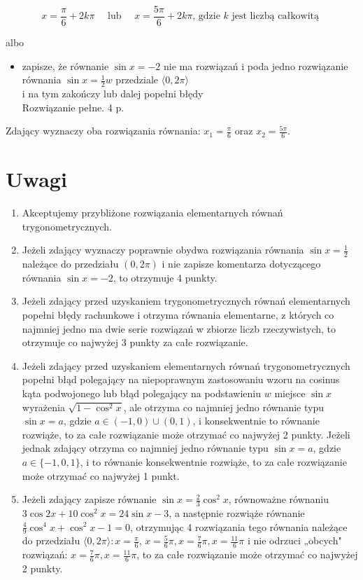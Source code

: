 \documentclass[10pt]{article}
\begin{document}
$$
x=\frac{\pi}{6}+2 k \pi \quad \text { lub } \quad x=\frac{5 \pi}{6}+2 k \pi \text {, gdzie } k \text { jest liczbą całkowitą }
$$

albo

\begin{itemize}
  \item zapisze, że równanie $\sin x=-2$ nie ma rozwiązań i poda jedno rozwiązanie równania $\sin x=\frac{1}{2} w$ przedziale $\langle 0,2 \pi\rangle$\\
i na tym zakończy lub dalej popełni błędy\\
Rozwiązanie pełne. 4 p.
\end{itemize}

Zdający wyznaczy oba rozwiązania równania: $x_{1}=\frac{\pi}{6}$ oraz $x_{2}=\frac{5 \pi}{6}$.

\section*{Uwagi}
\begin{enumerate}
  \item Akceptujemy przybliżone rozwiązania elementarnych równań trygonometrycznych.
  \item Jeżeli zdający wyznaczy poprawnie obydwa rozwiązania równania $\sin x=\frac{1}{2}$ należące do przedziału $(0,2 \pi)$ i nie zapisze komentarza dotyczącego równania $\sin x=-2$, to otrzymuje 4 punkty.
  \item Jeżeli zdający przed uzyskaniem trygonometrycznych równań elementarnych popełni błędy rachunkowe i otrzyma równania elementarne, z których co najmniej jedno ma dwie serie rozwiązań w zbiorze liczb rzeczywistych, to otrzymuje co najwyżej 3 punkty za całe rozwiązanie.
  \item Jeżeli zdający przed uzyskaniem elementarnych równań trygonometrycznych popełni błąd polegający na niepoprawnym zastosowaniu wzoru na cosinus kąta podwojonego lub błąd polegający na podstawieniu $w$ miejsce $\sin x$ wyrażenia $\sqrt{1-\cos ^{2} x}$, ale otrzyma co najmniej jedno równanie typu $\sin x=a$, gdzie $a \in(-1,0) \cup(0,1)$, i konsekwentnie to równanie rozwiąże, to za całe rozwiązanie może otrzymać co najwyżej 2 punkty. Jeżeli jednak zdający otrzyma co najmniej jedno równanie typu $\sin x=a$, gdzie $a \in\{-1,0,1\}$, i to równanie konsekwentnie rozwiąże, to za całe rozwiązanie może otrzymać co najwyżej 1 punkt.
  \item Jeżeli zdający zapisze równanie $\sin x=\frac{2}{3} \cos ^{2} x$, równoważne równaniu $3 \cos 2 x+10 \cos ^{2} x=24 \sin x-3$, a następnie rozwiąże równanie $\frac{4}{9} \cos ^{4} x+\cos ^{2} x-1=0$, otrzymując 4 rozwiązania tego równania należące do przedziału $\langle 0,2 \pi\rangle: x=\frac{\pi}{6}$, $x=\frac{5}{6} \pi, x=\frac{7}{6} \pi, x=\frac{11}{6} \pi$ i nie odrzuci „obcych" rozwiązań: $x=\frac{7}{6} \pi, x=\frac{11}{6} \pi$, to za całe rozwiązanie może otrzymać co najwyżej 2 punkty.
\end{enumerate}
\end{document}
